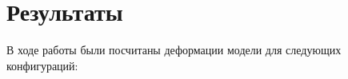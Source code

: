 \chapter{Результаты}\label{ch:results}
В ходе работы были посчитаны деформации модели для следующих конфигураций:

